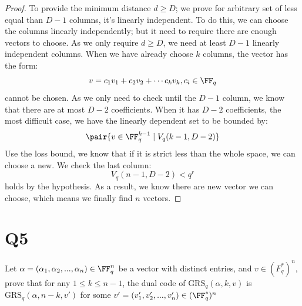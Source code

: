 \begin{proof}
To provide the minimum distance \( d \ge D \); we prove for arbitrary set of less equal than \( D - 1 \) columns, it's linearly independent. To do this, we can choose the columns linearly independently; but it need to require there are enough vectors to choose. As we only require \( d \ge D \), we need at least \( D - 1 \) linearly independent columns. When we have already choose \( k \) columns, the vector has the form:
\[
    v = c_1 v_1 + c_2 v_2 + \cdots c_k v_k, c_i \in \FF_q
\]
cannot be chosen. As we only need to check until the \( D - 1 \) column, we know that there are at most \( D - 2 \) coefficients. When it has \( D - 2 \) coefficients, the most difficult case, we have the linearly dependent set to be bounded by:
\[
    \pair{ v \in \FF_q^{ k - 1 } \mid V_q( k - 1, D - 2 ) }
\]
Use the loss bound, we know that if it is strict less than the whole space, we can choose a new. We check the last column:
\[
    V_q( n - 1, D - 2 ) < q^r
\]
holds by the hypothesis. As a result, we know there are new vector we can choose, which means we finally find \( n \) vectors.


\end{proof}




\section{Q5}
Let \( \alpha = ( \alpha_1, \alpha_2, ..., \alpha_n ) \in \FF_q^n \) be a vector with distinct entries, and \( v \in (F^*_q)^n \), prove that for any \( 1 \le k \le n - 1 \), the dual code of \( \text{GRS}_q( \alpha, k, v ) \) is \( \text{GRS}_q( \alpha, n - k, v' ) \) for some \( v' = ( v_1', v_2', ..., v_n' ) \in (\FF_q^*)^n \) 

